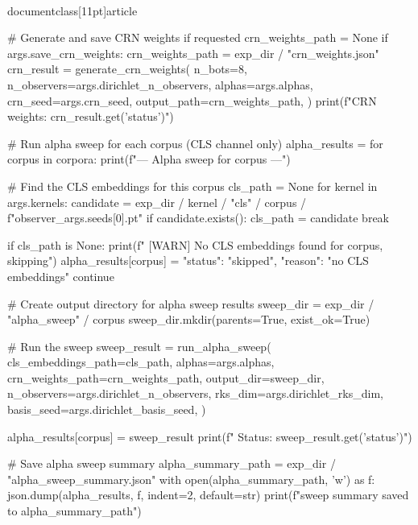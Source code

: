 \\documentclass[11pt]{article}
\begin{document}
\begin{CodeBlock}
        # Generate and save CRN weights if requested
        crn_weights_path = None
        if args.save_crn_weights:
            crn_weights_path = exp_dir / "crn_weights.json"
            crn_result = generate_crn_weights(
                n_bots=8,
                n_observers=args.dirichlet_n_observers,
                alphas=args.alphas,
                crn_seed=args.crn_seed,
                output_path=crn_weights_path,
            )
            print(f"CRN weights: {crn_result.get('status')}")
        
        # Run alpha sweep for each corpus (CLS channel only)
        alpha_results = {}
        for corpus in corpora:
            print(f"\n--- Alpha sweep for {corpus} ---")
            
            # Find the CLS embeddings for this corpus
            cls_path = None
            for kernel in args.kernels:
                candidate = exp_dir / kernel / "cls" / corpus / f"observer_{args.seeds[0]}.pt"
                if candidate.exists():
                    cls_path = candidate
                    break
            
            if cls_path is None:
                print(f"  [WARN] No CLS embeddings found for {corpus}, skipping")
                alpha_results[corpus] = {"status": "skipped", "reason": "no CLS embeddings"}
                continue
            
            # Create output directory for alpha sweep results
            sweep_dir = exp_dir / "alpha_sweep" / corpus
            sweep_dir.mkdir(parents=True, exist_ok=True)
            
            # Run the sweep
            sweep_result = run_alpha_sweep(
                cls_embeddings_path=cls_path,
                alphas=args.alphas,
                crn_weights_path=crn_weights_path,
                output_dir=sweep_dir,
                n_observers=args.dirichlet_n_observers,
                rks_dim=args.dirichlet_rks_dim,
                basis_seed=args.dirichlet_basis_seed,
            )
            
            alpha_results[corpus] = sweep_result
            print(f"  Status: {sweep_result.get('status')}")
        
        # Save alpha sweep summary
        alpha_summary_path = exp_dir / "alpha_sweep_summary.json"
        with open(alpha_summary_path, 'w') as f:
            json.dump(alpha_results, f, indent=2, default=str)
        print(f"\nAlpha sweep summary saved to {alpha_summary_path}")


\end{CodeBlock}
\end{document}

